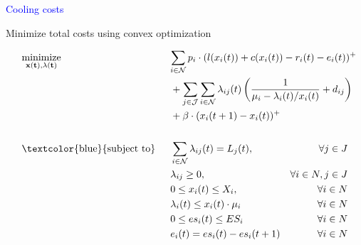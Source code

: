 \documentclass[xcolor=dvipsnames]{beamer}
\begin{document}
\begin{frame}{\textcolor{blue}{Cooling costs}}


\end{frame}

\begin{frame}{Minimize total costs using convex optimization}

\begin{align*}
&\underset{\bf{x}(t), \bf{\lambda}(t)}{\text{minimize}} & \hspace{0.5em}
	& \mathrlap{\sum_{i \in \mathcal{N}} p_i \cdot (l(x_i(t)) + c(x_i(t)) - r_i(t) - e_i(t))^+} \\
	&&& \mathrlap{{} + \sum_{j \in \mathcal{J}}\sum_{i \in \mathcal{N}} \lambda_{ij}(t)\left(\frac{1}{\mu_i - \lambda_i(t)/x_i(t)} + d_{ij}\right)} \\
	&&& \mathrlap{{} + \beta \cdot (x_i(t+1) - x_i(t))^+} \\
\\
&\text{\textcolor{blue}{subject to}}
	&& \sum_{i\in \mathcal{N}}\lambda_{ij}(t) = L_j(t), &\forall j\in J \\
	&&& \lambda_{ij} \geq 0, & \forall i\in N, j\in J \\
	&&& 0 \leq x_i(t) \leq X_i, & \forall i \in N \\
	&&& \lambda_i(t) \leq x_i(t) \cdot \mu_i & \forall i \in N \\
	&&& 0 \leq es_i(t) \leq ES_i & \forall i \in N \\
	&&& e_i(t) = es_i(t) - es_i(t+1) & \forall i \in N
\end{align*}

\end{frame}
\end{document}
